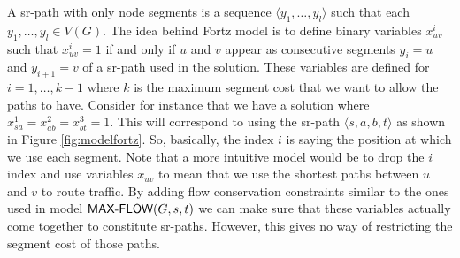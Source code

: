A sr-path with only node segments is a sequence $\langle y_1, \ldots, y_l \rangle$
such that each $y_1, \ldots, y_l \in V(G)$. The idea behind Fortz  model is to define binary variables 
$x^i_{uv}$ such that $x^i_{uv} = 1$ if and only if
$u$ and $v$ appear as consecutive segments $y_i = u$ and $y_{i + 1} = v$ of a sr-path used in the solution.
These variables are defined for $i = 1, \ldots, k - 1$ where $k$ is the maximum segment cost that we
want to allow the paths to have. Consider for instance that we have a solution where
$x^1_{sa} = x^2_{ab} = x^3_{bt} = 1$. This will correspond to using the sr-path $\langle s, a, b, t\rangle$
as shown in Figure \ref{fig:modelfortz}. So, basically, the index $i$ is saying the position at which we use
each segment.
Note that a more intuitive model would be to drop the $i$ index and use variables $x_{uv}$ to mean that we use
the shortest paths between $u$ and $v$ to route traffic. By adding flow conservation constraints similar to the
ones used in model $\textsf{MAX-FLOW}(G, s, t)$ we can make sure that these variables actually come together
to constitute sr-paths. However, this gives no way of restricting the segment cost of those paths.


